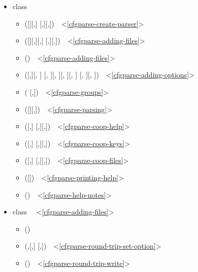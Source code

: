 \documentclass{howto}
\begin{document}
\begin{itemize}
\item class 
    \begin{itemize} 
    \item {}([][,]
        [,][,])~~<\ref{cfgparse-create-parser}>
    \item {}([][,][,]
        [,][,])~~<\ref{cfgparse-adding-files}>
    \item {}()~~<\ref{cfgparse-adding-files}>
    \item {}([,][, ]
        [, ][, ][, ][, ]
        [, ][, ])~~<\ref{cfgparse-adding-options}>
    \item {}(
        [,])~~<\ref{cfgparse-groups}>
    \item {}([][,])~~<\ref{cfgparse-parsing}>
    \item {}([,]
        [,][,])~~<\ref{cfgparse-coop-help}>
    \item {}([,]
        [,][,])~~<\ref{cfgparse-coop-keys}>
    \item {}([,]
        [,][,])~~<\ref{cfgparse-coop-files}>
    \item {}([])~~<\ref{cfgparse-printing-help}>
    \item {}()~~<\ref{cfgparse-help-notes}>
    \end{itemize}

\item class ~~<\ref{cfgparse-adding-files}>
    \begin{itemize} 
    \item {}()
    \item {}(,[,]
        [,])~~<\ref{cfgparse-round-trip-set-option}>
    \item {}()~~<\ref{cfgparse-round-trip-write}>
    \end{itemize}


\end{itemize}
\end{document}
